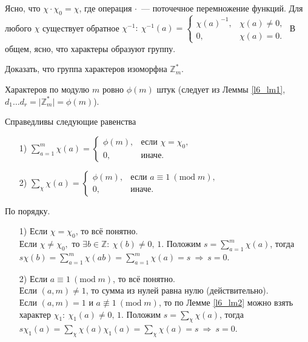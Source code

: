 Ясно, что $\chi \cdot \chi_0 = \chi$, где операция $\cdot$ — поточечное перемножение функций. Для любого $\chi$ существует обратное $\chi^{-1}: \ \chi^{-1}(a) = \begin{cases}
	\chi(a)^{-1}, & \chi(a) \ne 0, \\
	0, & \chi(a) = 0.
\end{cases}$ В общем, ясно, что характеры образуют группу.

\begin{problem} \label{l6_task}
	Доказать, что группа характеров изоморфна $\mathbb{Z}_m^\ast$.
\end{problem}

Характеров по модулю $m$ ровно $\phi(m)$ штук (следует из Леммы \ref{l6_lm1}, $d_1 \dots d_r = \lvert \mathbb{Z}_m^\ast \rvert = \phi(m)$).

\begin{lemma} \label{l6_lm3}
	Справедливы следующие равенства
	\begin{enumerate}[nolistsep]
		\item[1)] $\displaystyle \sum\limits_{a=1}^m \chi(a) =
			\begin{cases}
				\phi(m), & \text{если } \chi=\chi_0, \\
				0, & \text{иначе.}
			\end{cases}$
		\item[2)] $\displaystyle \sum\limits_\chi \chi(a) =
		\begin{cases}
			\phi(m), & \text{если } a \equiv 1 \ (\mathrm{mod} \; m), \\
			0, & \text{иначе.}
		\end{cases}$
	\end{enumerate}
\end{lemma}
\begin{pf}
	По порядку.
	\begin{enumerate}[nolistsep]
		\item[1)] Если $\chi = \chi_0$, то всё понятно.\\
			Если $\chi \ne \chi_0,$ то $\exists b \in \mathbb{Z}: \ \chi(b) \ne 0, \, 1$. Положим $\displaystyle s = \sum\limits_{a=1}^m \chi(a)$, тогда $\displaystyle s \chi(b) = \sum\limits_{a=1}^m \chi(ab) = \sum\limits_{a=1}^m \chi(a) = s \ \Rightarrow \ s = 0$.
		\item[2)] Если $a \equiv 1 \ (\mathrm{mod} \; m)$, то всё понятно.\\
			Если $(a,m) \ne 1$, то сумма из нулей равна нулю (действительно).\\
			Если $(a,m) = 1$ и $a \not\equiv 1 \ (\mathrm{mod} \; m)$, то по Лемме \ref{l6_lm2} можно взять характер $\chi_1: \ \chi_1(a) \ne 0, \, 1.$
			Положим $\displaystyle s = \sum\limits_\chi \chi(a)$, тогда $\displaystyle s \chi_1(a) = \sum\limits_\chi \chi(a)\chi_1(a) = \sum\limits_\chi \chi(a) = s \ \Rightarrow \ s = 0$.
	\end{enumerate}
\end{pf}

